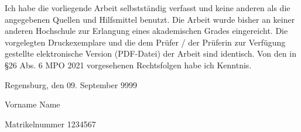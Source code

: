 \documentclass[11pt,a4paper,german,notitlepage]{report}
\newcommand{\authorname}{Vorname Name}
\newcommand{\matrikelnr}{1234567}
\newcommand{\abgabedatum}{09. September 9999}
\begin{document}
\vspace*{65pt}

Ich habe die vorliegende Arbeit selbstständig verfasst und keine anderen als die angegebenen Quellen und Hilfsmittel benutzt. Die Arbeit wurde bisher an keiner anderen Hochschule zur Erlangung eines akademischen Grades eingereicht. Die vorgelegten Druckexemplare und die dem Prüfer / der Prüferin zur Verfügung gestellte elektronische Version (PDF-Datei) der Arbeit sind identisch. Von den in §26 Abs. 6 MPO 2021 vorgesehenen Rechtsfolgen habe ich Kenntnis.


\vspace*{65pt}

Regensburg, den \abgabedatum

\vspace*{60pt}


\authorname

Matrikelnummer \matrikelnr
\end{document}
